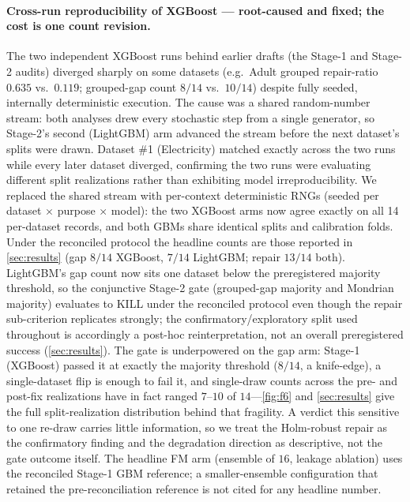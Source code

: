 \documentclass[pdflatex,sn-mathphys-num]{sn-jnl}
\begin{document}
\paragraph{Cross-run reproducibility of XGBoost --- root-caused and fixed; the cost is one count
revision.} The two independent XGBoost runs behind earlier drafts (the Stage-1 and Stage-2 audits) diverged
sharply on some datasets (e.g.\ Adult grouped repair-ratio $0.635$ vs.\ $0.119$; grouped-gap count
$8/14$ vs.\ $10/14$) despite fully seeded, internally deterministic execution. The cause was a shared random-number
stream: both analyses drew every stochastic step from a single generator, so
Stage-2's second (LightGBM) arm advanced the stream before the next dataset's splits were drawn. Dataset
\#1 (Electricity) matched exactly across the two runs while every later dataset diverged,
confirming the two runs were evaluating different split realizations rather than exhibiting model
irreproducibility. We replaced the shared stream with per-context deterministic RNGs (seeded per dataset
$\times$ purpose $\times$ model): the two XGBoost arms now agree exactly on all 14 per-dataset records, and
both GBMs share identical splits and calibration folds. Under the reconciled protocol the headline counts
are those reported in \cref{sec:results} (gap $8/14$ XGBoost, $7/14$ LightGBM; repair $13/14$ both). LightGBM's
gap count now sits one dataset below the preregistered majority threshold, so the conjunctive Stage-2 gate
(grouped-gap majority and Mondrian majority) evaluates to KILL under the reconciled protocol even though the repair
sub-criterion replicates strongly; the confirmatory/exploratory split used throughout is accordingly a
post-hoc reinterpretation, not an overall preregistered success (\cref{sec:results}). The gate is
underpowered on the gap arm: Stage-1 (XGBoost) passed it at exactly the majority threshold ($8/14$, a
knife-edge), a single-dataset flip is enough to fail it, and single-draw counts across the pre- and post-fix
realizations have in fact ranged $7$--$10$ of $14$---\cref{fig:f6} and \cref{sec:results} give the full
split-realization distribution behind that fragility. A verdict this sensitive to one re-draw carries
little information, so we treat the Holm-robust repair as the confirmatory finding and the degradation
direction as descriptive, not the gate outcome itself. The headline FM arm
(ensemble of $16$, leakage ablation) uses the reconciled Stage-1 GBM reference; a smaller-ensemble
configuration that retained the pre-reconciliation reference is not cited for any headline number.
\end{document}
